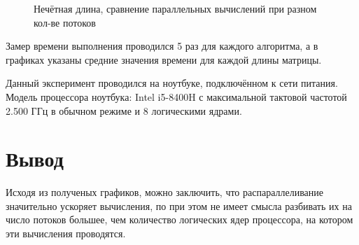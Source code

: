 \begin{figure}[H]
    \centering
    \caption{Нечётная длина, сравнение параллельных вычислений при разном кол-ве потоков}
    \label{img:uneven2}
\end{figure}

Замер времени выполнения проводился 5 раз для каждого алгоритма, а в графиках указаны средние значения времени для каждой длины матрицы.

Данный эксперимент проводился на ноутбуке, подключённом к сети питания. Модель процессора ноутбука: Intel i5-8400H с максимальной тактовой частотой 2.500 ГГц в обычном режиме и 8 логическими ядрами.

\section{Вывод}
Исходя из полученых графиков, можно заключить, что распараллеливание значительно ускоряет вычисления, по при этом не имеет смысла разбивать их на число потоков большее, чем количество логических ядер процессора, на котором эти вычисления проводятся.

